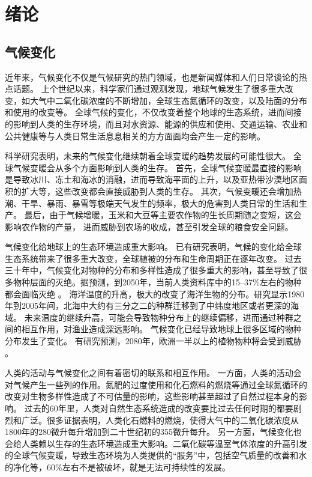\chapter{绪论}
\label{cha:intro}

\section{气候变化}

近年来，气候变化不仅是气候研究的热门领域，也是新闻媒体和人们日常谈论的热点话题。
上个世纪以来，科学家们通过观测发现，地球气候发生了很多重大改变，如大气中二氧化碳浓度的不断增加，全球生态氮循环的改变，以及陆面的分布和使用的改变等\cite{vitousek1994beyond}。
全球气候的变化，不仅改变着整个地球的生态系统，进而间接的影响到人类的生存环境，而且对水资源、能源的供应和使用、交通运输、农业和公共健康等与人类日常生活息息相关的方方面面均会产生一定的影响\cite{karl2009global}。



科学研究表明，未来的气候变化继续朝着全球变暖的趋势发展的可能性很大\cite{solomon2007climate,stocker2013ipcc}。
全球气候变暖会从多个方面影响到人类的生存。
首先，全球气候变暖最直接的影响是导致冰川、冻土和海冰的消融，进而导致海平面的上升，以及亚热带沙漠地区面积的扩大等，这些改变都会直接威胁到人类的生存\cite{stocker2013ipcc}。
其次，气候变暖还会增加热潮、干旱、暴雨、暴雪等极端天气发生的频率，极大的危害到人类日常的生活和生产\cite{solomon2007climate}。
最后，由于气候增暖，玉米和大豆等主要农作物的生长周期随之变短，这会影响农作物的产量， 进而威胁到农场的收成，甚至引发全球的粮食安全问题\cite{battisti2009historical,adams1990global,smith1989potential}。 


气候变化给地球上的生态环境造成重大影响。
已有研究表明，气候的变化给全球生态系统带来了很多重大改变，全球植被的分布和生命周期正在逐年改变\cite{parmesan2003globally}。
过去三十年中，气候变化对物种的分布和多样性造成了很多重大的影响，甚至导致了很多物种层面的灭绝。据预测，到2050年，当前人类资料库中的15–37\%左右的物种都会面临灭绝 \cite{thomas2004extinction} 。
海洋温度的升高，极大的改变了海洋生物的分布。研究显示1980年到2005年间，北海中大约有三分之二的种群迁移到了中纬度地区或者更深的海域\cite{perry2005climate}。
未来温度的继续升高，可能会导致物种分布上的继续偏移，进而通过种群之间的相互作用，对渔业造成深远影响。
气候变化已经导致地球上很多区域的物种分布发生了变化。 
有研究预测，2080年，欧洲一半以上的植物物种将会受到威胁\cite{thuiller2005climate} 。


人类的活动与气候变化之间有着密切的联系和相互作用。
一方面，人类的活动会对气候产生一些列的作用。氮肥的过度使用和化石燃料的燃烧等通过全球氮循环的改变对生物多样性造成了不可估量的影响，这些影响甚至超过了自然过程本身的影响。
过去的60年里，人类对自然生态系统造成的改变要比过去任何时期的都要剧烈和广泛。很多证据表明，人类化石燃料的燃烧，使得大气中的二氧化碳浓度从1800年的280微升每升增加到二十世纪初的355微升每升\cite{vitousek1994beyond}。
另一方面，气候变化也会给人类赖以生存的生态环境造成重大影响。二氧化碳等温室气体浓度的升高引发的全球气候变暖，导致生态环境为人类提供的“服务”中，包括空气质量的改善和水的净化等，60\%左右不是被破坏，就是无法可持续性的发展\cite{assessment2005ecosystems}。

